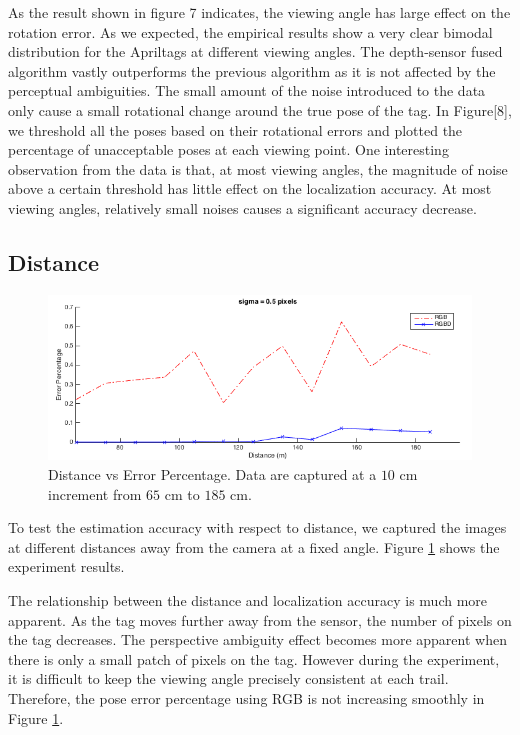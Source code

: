 As the result shown in figure 7 indicates, the viewing angle has large effect on the rotation error. As we expected, the empirical results show a very clear bimodal distribution for the Apriltags at different viewing angles. The depth-sensor fused algorithm vastly outperforms the previous algorithm as it is not affected by the perceptual ambiguities. The small amount of the noise introduced to the data only cause a small rotational change around the true pose of the tag. In Figure[8], we threshold all the poses based on their rotational errors and plotted the percentage of unacceptable poses at each viewing point. One interesting observation from the data is that, at most viewing angles, the magnitude of noise above a certain threshold has little effect on the localization accuracy. At most viewing angles, relatively small noises causes a significant accuracy decrease. 

\subsection{Distance}
\begin{figure}
\centering
\includegraphics[width=\columnwidth]{figs/distance_fig1}
\caption{Distance vs Error Percentage. Data are captured at a $10$ cm increment from $65$ cm to $185$ cm.}
\label{fig:distance_result}
\end{figure}
To test the estimation accuracy with respect to distance, we captured the images at different distances away from the camera at a fixed angle. Figure \ref{fig:distance_result} shows the experiment results.

The relationship between the distance and localization accuracy is much more apparent. As the tag moves further away from the sensor, the number of pixels on the tag decreases. The perspective ambiguity effect becomes more apparent when there is only a small patch of pixels on the tag. However during the experiment, it is difficult to keep the viewing angle precisely consistent at each trail. Therefore, the pose error percentage using RGB is not increasing smoothly in Figure \ref{fig:distance_result}.

